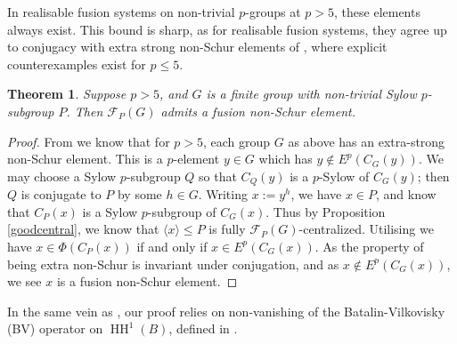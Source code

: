 \documentclass{amsart}
\theoremstyle{plain}\newtheorem{theorem}{Theorem}[section]
\theoremstyle{plain}\newtheorem{conjecture}[theorem]{Conjecture}
\theoremstyle{plain}\newtheorem{corollary}[theorem]{Corollary}
\theoremstyle{plain}\newtheorem{lemma}[theorem]{Lemma}
\theoremstyle{plain}\newtheorem{proposition}[theorem]{Proposition}
\theoremstyle{plain}\newtheorem{statement}[theorem]{}
\theoremstyle{definition}\newtheorem{definition}[theorem]{Definition}
\theoremstyle{definition}\newtheorem{example}[theorem]{Example}
\theoremstyle{definition}\newtheorem{examples}[theorem]{Examples}
\theoremstyle{definition}\newtheorem{notation}[theorem]{Notation}
\theoremstyle{definition}\newtheorem{remark}[theorem]{Remark}
\theoremstyle{definition}\newtheorem{remarks}[theorem]{Remarks}
\theoremstyle{definition}\newtheorem{question}[theorem]{Question}
\theoremstyle{definition}\newtheorem{propositiondefinition}[theorem]{Definition/Proposition}
\begin{document}
\MainDef*

 
In realisable fusion systems on non-trivial $p$-groups at $p>5$, these elements always exist. This bound is sharp, as for realisable fusion systems, they agree up to conjugacy with extra strong non-Schur elements of \cite{BR}, where explicit counterexamples exist for $p\leq 5$. 
 \begin{theorem}\label{thm:realisable}
 Suppose $p> 5$, and $G$ is a finite group with non-trivial Sylow $p$-subgroup $P$. Then $\mathcal{F}_P(G)$ admits a fusion non-Schur element.
 \end{theorem}
 \begin{proof} 
	 From \cite[Theorem 5.1]{BR} we know that for $p>5$, each group $G$ as above has an extra-strong non-Schur element. This is a $p$-element $y \in G$ which has $y \not \in E^p(C_G(y))$. We may choose a Sylow $p$-subgroup $Q$ so that $C_Q(y)$ is a $p$-Sylow of $C_G(y)$; then $Q$ is conjugate to $P$ by some $h\in G$. Writing $x := y^h$, we have $x \in P$, and know that $C_P(x)$ is a Sylow $p$-subgroup of $C_G(x)$. Thus by Proposition \ref{goodcentral}, we know that $\langle x \rangle \leq P$ is fully $\mathcal{F}_P(G)$-centralized. Utilising \cite[Lemma 3.8]{BR} we have $x \in \Phi(C_P(x))$ if and only if $x \in E^p(C_G(x))$. As the property of being extra non-Schur is invariant under conjugation, and as $x \not \in E^p(C_G(x))$, we see $x$ is a fusion non-Schur element.
 \end{proof}
 In the same vein as \cite{BR}, our proof relies on non-vanishing of the Batalin-Vilkovisky (BV) operator on $\operatorname{HH}^1(B)$, defined in \cite{tradler}.
\end{document}
